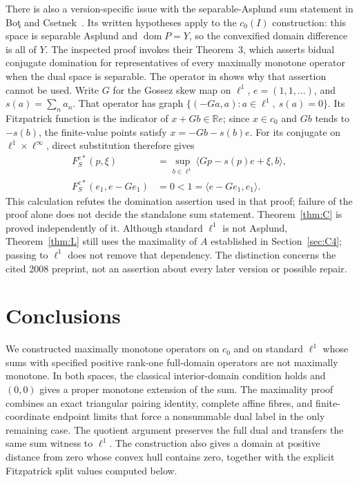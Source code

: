 \documentclass[11pt]{article}
\newcommand{\R}{\mathbb R}
\newcommand{\dom}{\operatorname{dom}}
\newcommand{\pair}[2]{\langle #1,#2\rangle}
\begin{document}
There is also a version-specific issue with the separable-Asplund sum
statement in Bo\c{t} and Csetnek~\cite[Corollary~11]{botcsetnek2008}.
Its written hypotheses apply to the $c_0(I)$ construction: this space
is separable Asplund and $\dom P=Y$, so the convexified domain difference
is all of $Y$. The inspected proof invokes their Theorem~3, which asserts
bidual conjugate domination for representatives of every maximally
monotone operator when the dual space is separable. The operator in
\cite[Lemma~2.1]{buenosvaiter2011} shows why that assertion cannot be used.
Write $G$ for the Gossez skew map on $\ell^1$, $e=(1,1,\ldots)$, and
$s(a)=\sum_n a_n$. That operator has graph
$\{(-Ga,a):a\in\ell^1,\ s(a)=0\}$. Its Fitzpatrick function is the
indicator of $x+Gb\in\R e$; since $x\in c_0$ and $Gb$ tends to $-s(b)$,
the finite-value points satisfy $x=-Gb-s(b)e$. For its conjugate on
$\ell^1\times\ell^\infty$, direct substitution therefore gives
\begin{equation}
\begin{aligned}
F_S^{c*}(p,\xi)
 &=\sup_{b\in\ell^1}\pair{Gp-s(p)e+\xi}{b},\\
F_S^{c*}(e_1,e-Ge_1)&=0<1=\pair{e-Ge_1}{e_1}.
\end{aligned}
\label{eq:bidual-interface}
\end{equation}
This calculation refutes the domination assertion used in that proof;
failure of the proof alone does not decide the standalone sum statement.
Theorem~\ref{thm:C} is proved independently of it. Although standard
$\ell^1$ is not Asplund, Theorem~\ref{thm:L} still uses the maximality
of $A$ established in Section~\ref{sec:C4}; passing to $\ell^1$ does not
remove that dependency. The distinction concerns the cited 2008 preprint,
not an assertion about every later version or possible repair.

\section{Conclusions}
\label{sec:conclusion}
We constructed maximally monotone operators on $c_0$ and on standard
$\ell^1$ whose sums with specified positive rank-one full-domain
operators are not maximally monotone. In both spaces, the classical
interior-domain condition holds and $(0,0)$ gives a proper monotone
extension of the sum. The maximality proof combines an exact triangular
pairing identity, complete affine fibres, and finite-coordinate endpoint
limits that force a nonsummable dual label in the only remaining case.
The quotient argument preserves the full dual and transfers the same
sum witness to $\ell^1$. The construction also gives a domain at
positive distance from zero whose convex hull contains zero, together
with the explicit Fitzpatrick split values computed below.
\end{document}
